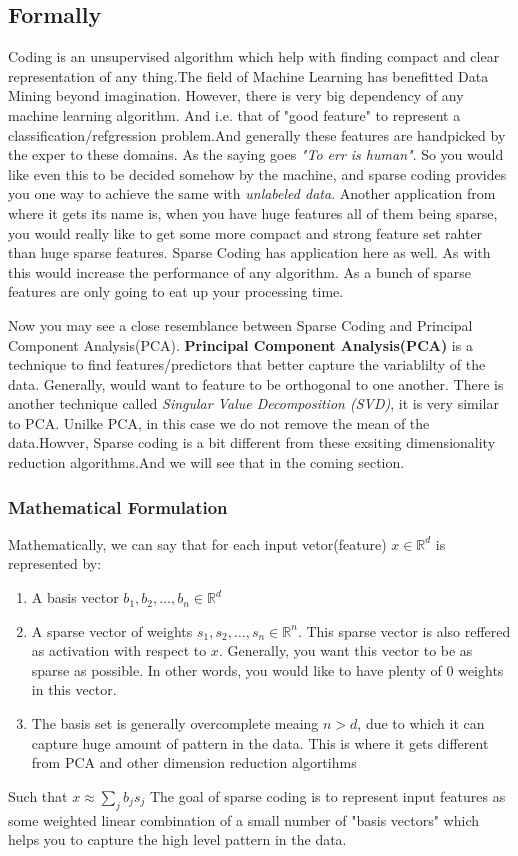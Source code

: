 \documentclass[journal]{IEEEtran}
\begin{document}
\subsection{Formally}
 Coding  is an unsupervised algorithm which help with finding compact and clear representation of any thing.The field of Machine Learning has benefitted Data Mining beyond imagination. However, there is very big dependency of any machine learning algorithm. And i.e. that of "good feature" to represent a classification/refgression problem.And generally these features are handpicked by the exper to these domains. As the saying goes \emph{"To err is human"}. So you would like even this to be decided somehow by the machine, and sparse coding provides you one way to achieve the same with \emph{unlabeled data}. Another application from where it gets its name is, when you have huge features all of them being sparse, you would really like to get some more compact and strong feature set rahter than huge sparse features. Sparse Coding has application here as well. As with this would increase the performance of any algorithm. As a bunch of sparse features are only going to eat up your processing time.

Now you may see a close resemblance between Sparse Coding and Principal Component Analysis(PCA). \textbf{Principal Component Analysis(PCA)} is a technique to find features/predictors that better capture the variablilty of the data. Generally, would want to feature to be orthogonal to one another. There is another technique called \emph{Singular Value Decomposition (SVD)}, it is very similar to PCA. Unilke PCA, in this case we do not remove the mean of the data.Howver, Sparse coding is a bit different from these exsiting dimensionality reduction algorithms.And we will see that in the coming section.\\

\subsubsection{Mathematical Formulation}
Mathematically, we can say that for each input vetor(feature) $x \in \mathbb{R}^d$ is represented by:
\begin{enumerate}
	\item A basis vector $b_1,b_2, \ldots ,b_n  \in \mathbb{R}^d$ 
	\item A sparse vector of weights $s_1,s_2, \ldots ,s_n \in \mathbb{R}^n$. This sparse vector is also reffered as activation with respect to $x$. Generally, you want this vector to be as sparse as possible. In other words, you would like to have plenty of 0
 weights in this vector. 
	\item The basis set is generally overcomplete meaing $n>d$, due to which it can capture huge amount of pattern in the data. This is where it gets different from PCA and other dimension reduction algortihms
\end{enumerate}
Such that $x \approx \sum_j b_js_j$
The goal of sparse coding is to represent input features as some weighted linear combination of a small number of "basis vectors" which helps you to capture the high level pattern in the data. 
\end{document}
